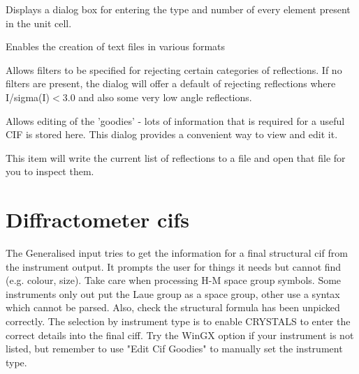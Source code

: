 \documentclass[10pt,a4paper]{report}
\begin{document}
Displays a dialog box for entering the type and number of every element
present in the unit cell.






\bigskip{}




Enables the creation of text files in various formats




\bigskip{}




Allows filters to be specified for rejecting certain categories of
reflections. If no filters are present, the dialog will offer a default
of rejecting reflections where I/sigma(I)$<$3.0 and also some very low angle
reflections.




\bigskip{}




Allows editing of the 'goodies' - lots of information that is required
for a useful CIF is stored here. This dialog provides a convenient way
to view and edit it.




\bigskip{}




This item will write the current list of reflections to a file and open
that file for you to inspect them.



\section{Diffractometer cifs}
\label{Preprocess} 


The Generalised input tries to get the information for a final 
structural cif from the instrument output. It prompts the user for 
things it needs but cannot find (e.g. colour, size).  Take care when 
processing H-M space group symbols. Some instruments only out put
the Laue group as a space group, other use a syntax which cannot be 
parsed. Also, check the structural formula has been unpicked correctly.
The selection by instrument type is to enable CRYSTALS to enter
the correct details into the final ciff.
Try the WinGX option if your instrument is not listed, but remember to 
use "Edit Cif Goodies" to manually set the instrument type.




\bigskip{}
\end{document}
